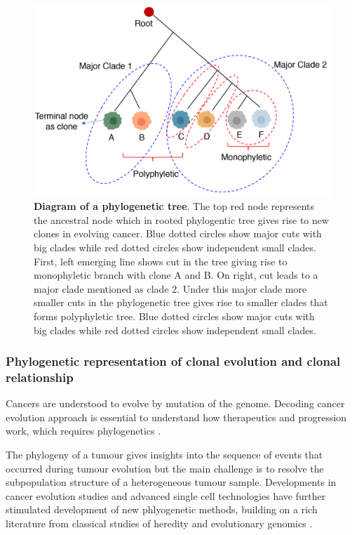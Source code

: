  \begin{figure}
\centering
\includegraphics[width=\textwidth]{Figures/chap1/phylogenetictree.png}
	\caption[Diagram of a phylogenetic tree]
	{\small
	    \textbf{Diagram of a phylogenetic tree}.
	 The top red node represents the ancestral node which in rooted phylogentic tree gives rise to new clones in evolving cancer.  Blue dotted circles show major cuts with big clades while red dotted circles show independent small clades. First, left emerging line shows cut in the tree giving rise to monophyletic branch with clone A and B. On right, cut leads to a major clade mentioned as clade 2. Under this major clade more smaller cuts in the phylogenetic tree gives rise to smaller clades that forms polyphyletic tree. Blue dotted circles show major cuts with big clades while red dotted circles show independent small clades.
	}
	\label{fig:phylogentictree}
\end{figure}
 \subsubsection{Phylogenetic representation of clonal evolution and clonal relationship}
Cancers are understood to evolve by mutation of the genome. Decoding cancer evolution approach is essential to understand how therapeutics and progression work, which requires phylogenetics \cite{burrell2013causes, tabassum2015tumorigenesis}. 

The phylogeny of a tumour gives insights into the sequence of events that occurred during tumour evolution but the main challenge is to resolve the subpopulation structure of a heterogeneous tumour sample. Developments in cancer evolution studies and advanced single cell technologies \cite{laks2019clonal} have further  stimulated development of new phlyogenetic methods, building on a rich literature from classical studies of heredity and evolutionary genomics \cite{schwartz2017evolution}. 

